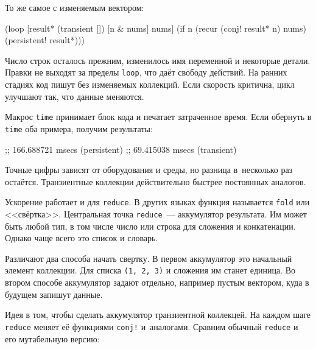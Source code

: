 \noindent
То же самое с изменяемым вектором:

\begin{english}
  \begin{clojure}
(loop [result* (transient [])
       [n & nums] nums]
  (if n
    (recur (conj! result* n) nums)
    (persistent! result*)))
  \end{clojure}
\end{english}

Число строк осталось прежним, изменилось имя переменной и некоторые
детали. Правки не выходят за пределы \verb|loop|, что даёт свободу
действий. На ранних стадиях код пишут без изменяемых коллекций. Если скорость
критична, цикл улучшают так, что данные меняются.

Макрос \verb|time| принимает блок кода и печатает затраченное время. Если
обернуть в \verb|time| оба примера, получим результаты:

\begin{english}
  \begin{text}
;; 166.688721 msecs (persistent)
;;  69.415038 msecs (transient)
  \end{text}
\end{english}

Точные цифры зависят от оборудования и среды, но разница в~несколько раз
остаётся. Транзиентные коллекции действительно быстрее постоянных аналогов.


Ускорение работает и для \verb|reduce|. В других языках функция называется
\verb|fold| или <<свёртка>>. Центральная точка \verb|reduce|~---
аккумулятор результата. Им может быть любой тип, в том числе число или строка
для сложения и конкатенации. Однако чаще всего это список и словарь.

Различают два способа начать свертку. В первом аккумулятор это начальный
элемент коллекции. Для списка \verb|(1, 2, 3)| и сложения им станет
единица. Во втором способе аккумулятор задают отдельно, например пустым вектором, куда в
будущем запишут данные.

Идея в том, чтобы сделать аккумулятор транзиентной коллекцей. На каждом шаге
\verb|reduce| меняет её функциями \verb|conj!| и~аналогами. Сравним
обычный \verb|reduce| и его мутабельную версию:


